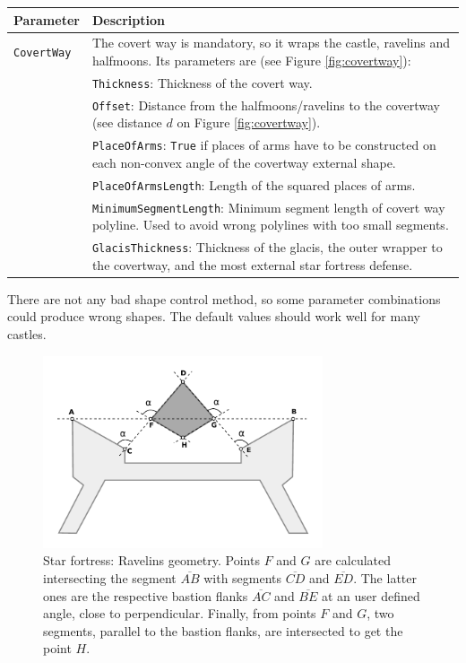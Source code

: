 \documentclass[tog]{acmsiggraph}
\begin{document}
\begin{tabularx}{0.48\textwidth}{ |l|X| }
\hline 
\textbf{Parameter} & \textbf{Description} \\[0.15cm]
 \hline
  \texttt{CovertWay} & The covert way is mandatory, so it wraps the castle, ravelins and halfmoons. Its parameters are (see Figure \ref{fig:covertway}): \\
  & \quad\texttt{Thickness}: Thickness of the covert way. \\
  & \quad\texttt{Offset}: Distance from the halfmoons/ravelins to the covertway (see distance $d$ on Figure \ref{fig:covertway}). \\
  & \quad\texttt{PlaceOfArms}: \texttt{True} if places of arms have to be constructed on each non-convex angle of the covertway external shape.\\
  & \quad\texttt{PlaceOfArmsLength}: Length of the squared places of arms.\\
  & \quad\texttt{MinimumSegmentLength}: Minimum segment length of covert way polyline. Used to avoid wrong polylines with too small segments. \\
  & \quad\texttt{GlacisThickness}: Thickness of the glacis, the outer wrapper to the covertway, and the most external star fortress defense. \\
  \hline  
\end{tabularx} 


There are not any bad shape control method, so some parameter combinations could produce wrong shapes. 
The default values should work well for many castles.

\begin{figure}[ht]
  \centering
  \includegraphics[width=3.25in]{figs/ravelin}
  \caption{Star fortress: Ravelins geometry. Points $F$ and $G$ are calculated intersecting the segment $\overline{AB}$ with segments $\overline{CD}$ and $\overline{ED}$. 
The latter ones are the respective bastion flanks $\overline{AC}$ and $\overline{BE}$ at an user defined angle, close to perpendicular.
Finally, from points $F$ and $G$, two segments, parallel to the bastion flanks, are intersected to get the point $H$.
}
  \label{fig:ravelin}
\end{figure}
\end{document}
